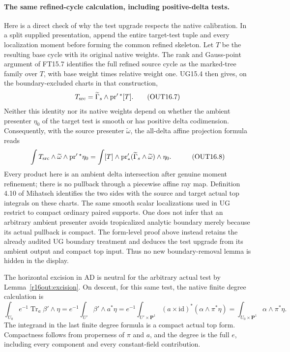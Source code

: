 \paragraph{The same refined-cycle calculation, including positive-delta tests.}
Here is a direct check of why the test upgrade respects the native
calibration.  In a split supplied presentation, append the entire
target-test tuple and every localization moment before forming
the common refined skeleton.  Let $T$ be the resulting base cycle
with its original native weights.  The rank and Gauss-point argument
of FT15.7 identifies the full refined source cycle as the marked-tree
family over $T$, with base weight times relative weight one.  UG15.4
then gives, on the boundary-excluded charts in that construction,
\[
 T_{\rm src}=\widetilde\Gamma_s\wedge\operatorname{pr}'{}^*[T].
 \tag{OUT16.7}\label{r16out:cycle}
\]
Neither this identity nor its native weights depend on whether the
ambient presenter $\eta_0$ of the target test is smooth or has
positive delta codimension.  Consequently, with the source presenter
$\widetilde\omega$, the all-delta affine projection formula reads
\[
\begin{split}
 \int T_{\rm src}\wedge\widetilde\omega
                           \wedge\operatorname{pr}'{}^\star\eta_0
 &=\int [T]\wedge
      \operatorname{pr}'_*(\widetilde\Gamma_s\wedge\widetilde\omega)
                           \wedge\eta_0.
\end{split}
 \tag{OUT16.8}\label{r16out:cycle-test}
\]
Every product here is an ambient delta intersection after genuine
moment refinement; there is no pullback through a piecewise affine
ray map.  Definition 4.10 of Mihatsch identifies the two sides with
the source and target actual top integrals on these charts.  The
same smooth scalar localizations used in UG restrict to compact
ordinary paired supports.  One does not infer that an arbitrary
ambient presenter avoids tropicalized analytic boundary merely
because its actual pullback is compact.  The form-level proof above
instead retains the already audited UG boundary treatment and
deduces the test upgrade from its ambient output and compact top
input.  Thus no new boundary-removal lemma is hidden in the display.

The horizontal excision in AD is neutral for the arbitrary actual
test by Lemma~\ref{r16out:excision}.  On descent, for this same test,
the native finite degree calculation is
\[
 \int_{U_0}e^{-1}\operatorname{Tr}_a\beta'\wedge\eta
 =e^{-1}\int_{U'}\beta'\wedge a^*\eta
 =e^{-1}\int_{U'\times\mathbf P^1}
           (a\times\mathrm{id})^*(\alpha\wedge\pi^*\eta)
 =\int_{U_0\times\mathbf P^1}\alpha\wedge\pi^*\eta.
 \tag{OUT16.9}\label{r16out:native}
\]
The integrand in the last finite degree formula is a compact actual
top form.  Compactness follows from properness of $\pi$ and $a$,
and the degree is the full $e$, including every component and every
constant-field contribution.

